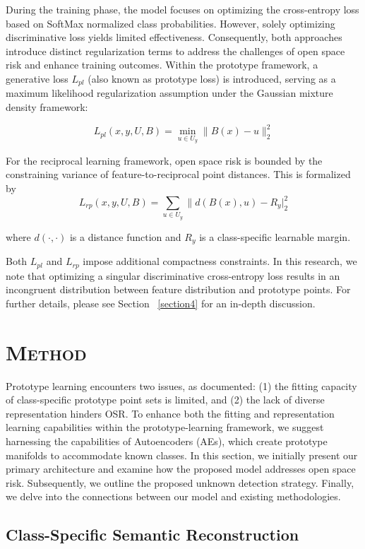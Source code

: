 \documentclass{gji}
\begin{document}
During the training phase, the model focuses on optimizing the cross-entropy loss based on SoftMax normalized class probabilities. However, solely optimizing discriminative loss yields limited effectiveness. Consequently, both approaches introduce distinct regularization terms to address the challenges of open space risk and enhance training outcomes. Within the prototype framework, a generative loss $L_{pl}$ (also known as prototype loss) is introduced, serving as a maximum likelihood regularization assumption under the Gaussian mixture density framework:

\[
L_{pl}(x, y, U, B) = \min_{u \in U_y} \|B(x) - u\|_2^2 \tag{3} \label{eq3}
\]


For the reciprocal learning framework, open space risk is bounded by the constraining variance of feature-to-reciprocal point distances. This is formalized by
\[
L_{rp}(x, y, U, B) = \sum_{u \in U_y} \|d(B(x), u) - R_y|_2^2 \tag{4} \label{eq4} 
\]

where $d(\cdot, \cdot)$ is a distance function and $R_y$ is a class-specific learnable margin.

Both $L_{pl}$ and $L_{rp}$ impose additional compactness constraints. In this research, we note that optimizing a singular discriminative cross-entropy loss results in an incongruent distribution between feature distribution and prototype points. For further details, please see Section ~\ref{section4} for an in-depth discussion.

\section[]{\textbf\mdseries \textsc{M}\lowercase{\textsc{ethod}}} 

Prototype learning encounters two issues, as documented: (1) the fitting capacity of class-specific prototype point sets is limited, and (2) the lack of diverse representation hinders OSR. To enhance both the fitting and representation learning capabilities within the prototype-learning framework, we suggest harnessing the capabilities of Autoencoders (AEs), which create prototype manifolds to accommodate known classes. In this section, we initially present our primary architecture and examine how the proposed model addresses open space risk. Subsequently, we outline the proposed unknown detection strategy. Finally, we delve into the connections between our model and existing methodologies.


\subsection{Class-Specific Semantic Reconstruction}
\end{document}
